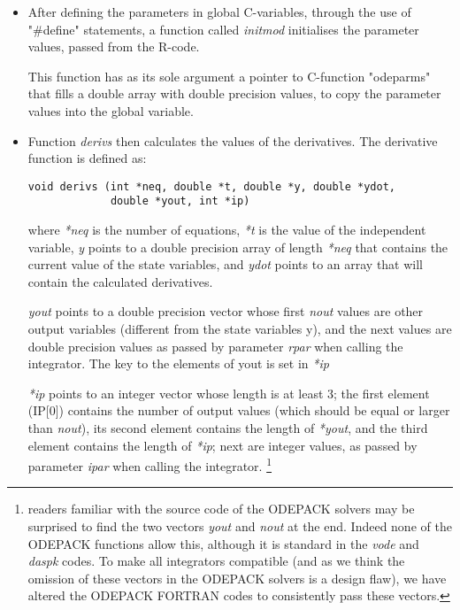 \documentclass[english]{article}
\begin{document}
\begin{itemize}
\item After defining the parameters in global C-variables, through
the use of "\#define" statements, a function called \emph{initmod}
initialises the parameter values, passed from the R-code.

This function has as its sole argument a pointer to C-function "odeparms"
that fills a double array with double precision values, to copy the parameter
values into the global variable.

\item Function \emph{derivs} then calculates the values
of the derivatives.  The derivative function is defined as:
\begin{verbatim}
void derivs (int *neq, double *t, double *y, double *ydot,
             double *yout, int *ip)
\end{verbatim}
where \emph{*neq} is the number of equations, \emph{*t} is the value
of the independent variable, \emph{y} points to a double precision
array of length \emph{*neq} that contains the current value of the
state variables, and \emph{ydot} points to an array that will contain
the calculated derivatives.

\emph{yout} points to a double precision vector whose first \emph{nout} values are other output variables (different from the state variables y),
and the next values are double precision values as passed by parameter \emph{rpar} when calling the integrator.
The key to the elements of yout is set in \emph{*ip}

\emph{*ip} points to an integer vector whose length is at least 3; the first element (IP[0]) contains the number of output values (which should be equal or larger than \emph{nout}),
its second element contains the length of \emph{*yout}, and the third element contains the length of \emph{*ip};
next are integer values, as passed by parameter \emph{ipar} when calling the integrator.
\footnote{readers familiar with the source code of the ODEPACK solvers may be surprised to find
the two vectors \emph{yout} and \emph{nout} at the end. Indeed none of the ODEPACK
functions allow this, although it is standard in the \emph{vode} and \emph{daspk} codes.
To make all integrators compatible (and as we think the omission of these vectors in
the ODEPACK solvers is a design flaw), we have altered the ODEPACK FORTRAN
codes to consistently pass these vectors. }


\end{itemize}
\end{document}
